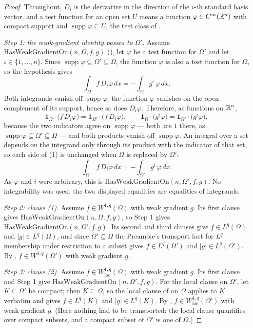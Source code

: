 \begin{proof}
Throughout, $D_i$ is the derivative in the direction of the $i$-th standard
basis vector, and a test function for an open set $U$ means a function
$\varphi\in C^\infty(\mathbb{R}^n)$ with compact support and
$\operatorname{supp}\varphi\subseteq U$, the test class of
.

\emph{Step 1: the weak-gradient identity passes to $\Omega'$.}  Assume
$\mathrm{HasWeakGradientOn}(n,\Omega,f,g)$ (), let
$\varphi$ be a test function for $\Omega'$ and let $i\in\{1,\dots,n\}$.  Since
$\operatorname{supp}\varphi\subseteq\Omega'\subseteq\Omega$, the function
$\varphi$ is also a test function for $\Omega$, so the hypothesis gives
\[
\int_\Omega f\,D_i\varphi\,dx=-\int_\Omega g^i\,\varphi\,dx .
\tag{1}
\]
Both integrands vanish off $\operatorname{supp}\varphi$: the function $\varphi$
vanishes on the open complement of its support, hence so does $D_i\varphi$.
Therefore, as functions on $\mathbb{R}^n$,
\[
\mathbf1_\Omega\cdot\bigl(f\,D_i\varphi\bigr)
=\mathbf1_{\Omega'}\cdot\bigl(f\,D_i\varphi\bigr),
\qquad
\mathbf1_\Omega\cdot\bigl(g^i\varphi\bigr)
=\mathbf1_{\Omega'}\cdot\bigl(g^i\varphi\bigr),
\]
because the two indicators agree on $\operatorname{supp}\varphi$ --- both are
$1$ there, as $\operatorname{supp}\varphi\subseteq\Omega'\subseteq\Omega$ ---
and both products vanish off $\operatorname{supp}\varphi$.  An integral over a
set depends on the integrand only through its product with the indicator of that
set, so each side of (1) is unchanged when $\Omega$ is replaced by $\Omega'$:
\[
\int_{\Omega'}f\,D_i\varphi\,dx=-\int_{\Omega'}g^i\,\varphi\,dx .
\]
As $\varphi$ and $i$ were arbitrary, this is
$\mathrm{HasWeakGradientOn}(n,\Omega',f,g)$.  No integrability was used: the two
displayed equalities are equalities of integrands.

\emph{Step 2: clause (1).}  Assume $f\in W^{1,q}(\Omega)$ with weak gradient $g$.
Its first clause gives $\mathrm{HasWeakGradientOn}(n,\Omega,f,g)$, so Step 1
gives $\mathrm{HasWeakGradientOn}(n,\Omega',f,g)$.  Its second and third clauses
give $f\in L^q(\Omega)$ and $|g|\in L^q(\Omega)$, and since
$\Omega'\subseteq\Omega$ the Preamble's transport fact for $L^q$ membership
under restriction to a subset gives $f\in L^q(\Omega')$ and
$|g|\in L^q(\Omega')$.  By , $f\in W^{1,q}(\Omega')$ with weak
gradient $g$.

\emph{Step 3: clause (2).}  Assume $f\in W^{1,q}_{\mathrm{loc}}(\Omega)$ with
weak gradient $g$.  Its first clause and Step 1 give
$\mathrm{HasWeakGradientOn}(n,\Omega',f,g)$.  For the local clause on $\Omega'$,
let $K\subseteq\Omega'$ be compact; then $K\subseteq\Omega$, so the local clause
of  on $\Omega$ applies to $K$ verbatim and gives
$f\in L^q(K)$ and $|g|\in L^q(K)$.  By ,
$f\in W^{1,q}_{\mathrm{loc}}(\Omega')$ with weak gradient $g$.  (Here nothing
had to be transported: the local clause quantifies over compact subsets, and a
compact subset of $\Omega'$ is one of $\Omega$.)


\end{proof}
